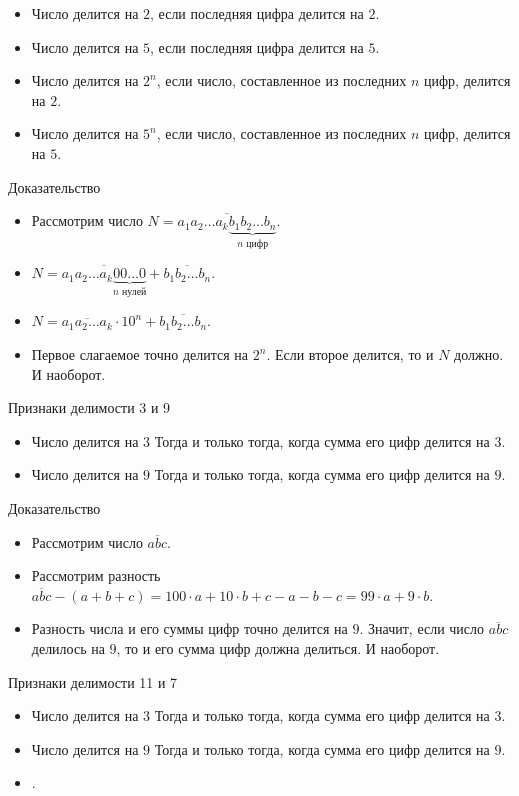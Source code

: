 \documentclass[17pt]{extarticle}
\newcommand{\newslide}[1]{\newpage \begin{center} \large #1 \end{center}}
\begin{document}
\begin{itemize}\itemsep=0mm
\item Число делится на $2$, если последняя цифра делится на $2$.
\item Число делится на $5$, если последняя цифра делится на $5$.
\item Число делится на $2^n$, если число, составленное из последних $n$ цифр, делится на $2$.
\item Число делится на $5^n$, если число, составленное из последних $n$ цифр, делится на $5$.
\end{itemize}

\newslide{Доказательство}\vspace{-7mm}

\begin{itemize}\itemsep=0mm
\item Рассмотрим число $N = \overline{a_1a_2\ldots a_k\underbrace{b_1b_2\ldots b_n}_{n \text{ цифр}}}$.
\item $N = \overline{a_1a_2\ldots a_k\underbrace{00\ldots 0}_{n \text{ нулей}}} + \overline{b_1b_2\ldots b_n}$.
\item $N = \overline{a_1a_2\ldots a_k}\cdot10^n + \overline{b_1b_2\ldots b_n}$.
\item Первое слагаемое точно делится на $2^n$. Если второе делится, то и $N$ должно. И наоборот.
\end{itemize}

\newslide{Признаки делимости 3 и 9}

\begin{itemize}
\item Число делится на $3$ Тогда и только тогда, когда сумма его цифр делится на $3$.
\item Число делится на $9$ Тогда и только тогда, когда сумма его цифр делится на $9$.
\end{itemize}

\newslide{Доказательство}

\begin{itemize}
\item Рассмотрим число $\overline{abc}$.
\item Рассмотрим разность $\overline{abc} - (a+b+c) = 100\cdot a + 10\cdot b + c - a-b-c = 99\cdot a + 9\cdot b$.
\item Разность числа и его суммы цифр точно делится на $9$. Значит, если число $\overline{abc}$ делилось на $9$, то и его сумма цифр должна делиться. И наоборот.
\end{itemize}

\newslide{Признаки делимости 11 и 7}

\begin{itemize}
\item Число делится на $3$ Тогда и только тогда, когда сумма его цифр делится на $3$.
\item Число делится на $9$ Тогда и только тогда, когда сумма его цифр делится на $9$.
\end{itemize}

\newslide{}

\begin{itemize}
\item .
\end{itemize}
\end{document}
